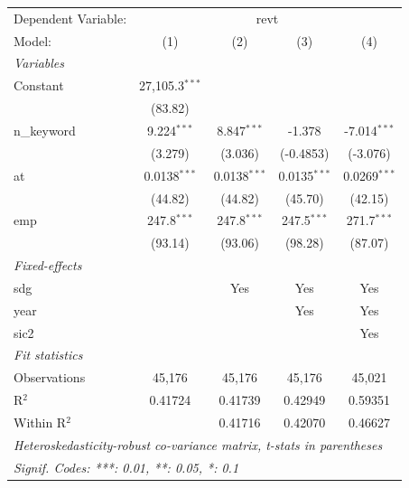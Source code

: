 
\begingroup
\centering
\begin{tabular}{lcccc}
   \tabularnewline \midrule \midrule
   Dependent Variable: & \multicolumn{4}{c}{revt}\\
   Model:       & (1)              & (2)            & (3)            & (4)\\  
   \midrule
   \emph{Variables}\\
   Constant     & 27,105.3$^{***}$ &                &                &   \\   
                & (83.82)          &                &                &   \\   
   n\_keyword   & 9.224$^{***}$    & 8.847$^{***}$  & -1.378         & -7.014$^{***}$\\   
                & (3.279)          & (3.036)        & (-0.4853)      & (-3.076)\\   
   at           & 0.0138$^{***}$   & 0.0138$^{***}$ & 0.0135$^{***}$ & 0.0269$^{***}$\\   
                & (44.82)          & (44.82)        & (45.70)        & (42.15)\\   
   emp          & 247.8$^{***}$    & 247.8$^{***}$  & 247.5$^{***}$  & 271.7$^{***}$\\   
                & (93.14)          & (93.06)        & (98.28)        & (87.07)\\   
   \midrule
   \emph{Fixed-effects}\\
   sdg          &                  & Yes            & Yes            & Yes\\  
   year         &                  &                & Yes            & Yes\\  
   sic2         &                  &                &                & Yes\\  
   \midrule
   \emph{Fit statistics}\\
   Observations & 45,176           & 45,176         & 45,176         & 45,021\\  
   R$^2$        & 0.41724          & 0.41739        & 0.42949        & 0.59351\\  
   Within R$^2$ &                  & 0.41716        & 0.42070        & 0.46627\\  
   \midrule \midrule
   \multicolumn{5}{l}{\emph{Heteroskedasticity-robust co-variance matrix, t-stats in parentheses}}\\
   \multicolumn{5}{l}{\emph{Signif. Codes: ***: 0.01, **: 0.05, *: 0.1}}\\
\end{tabular}
\par\endgroup


